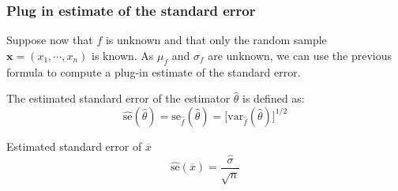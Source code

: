 \frame
{
\frametitle{Plug in estimate of the standard error}

Suppose now that $f$ is unknown and that only the random sample $\mathbf{x}=(x_1,\cdots,x_n)$ is known.
As $\mu_f$ and $\sigma_f$ are unknown, we can use the previous formula to compute a plug-in estimate of the  standard error.
\begin{definition}
The \alert{estimated standard error} of the estimator $\hat{\theta}$ is defined as:
$$
\hat{\mathrm{se}}(\hat{\theta})=\mathrm{se}_{\hat{f}}(\hat{\theta})=\lbrack\mathrm{var}_{\hat{f}}(\hat{\theta})\rbrack^{1/2}
$$
\end{definition}


\begin{exampleblock}{Estimated standard error of $\overline{x}$ }
$$
\hat{\mathrm{se}} (\overline{x})=\frac{\hat{\sigma}}{\sqrt{n}}
$$
\end{exampleblock}
}






